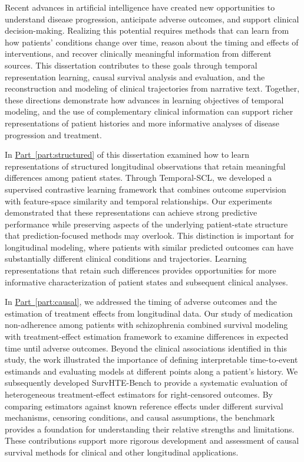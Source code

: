 Recent advances in artificial intelligence have created new opportunities to understand disease progression, anticipate adverse outcomes, and support clinical decision-making.
Realizing this potential requires methods that can learn from how patients' conditions change over time, reason about the timing and effects of interventions, and recover clinically meaningful information from different sources.
This dissertation contributes to these goals through temporal representation learning, causal survival analysis and evaluation, and the reconstruction and modeling of clinical trajectories from narrative text.
Together, these directions demonstrate how advances in learning objectives of temporal modeling, and the use of complementary clinical information can support richer representations of patient histories and more informative analyses of disease progression and treatment.

In \hyperref[part:structured]{Part~\ref*{part:structured}} of this dissertation examined how to learn representations of structured longitudinal observations that retain meaningful differences among patient states.
Through Temporal-SCL, we developed a supervised contrastive learning framework that combines outcome supervision with feature-space similarity and temporal relationships.
Our experiments demonstrated that these representations can achieve strong predictive performance while preserving aspects of the underlying patient-state structure that prediction-focused methods may overlook.
This distinction is important for longitudinal modeling, where patients with similar predicted outcomes can have substantially different clinical conditions and trajectories.
Learning representations that retain such differences provides opportunities for more informative characterization of patient states and subsequent clinical analyses.

In \hyperref[part:causal]{Part~\ref*{part:causal}}, we addressed the timing of adverse outcomes and the estimation of treatment effects from longitudinal data.
Our study of medication non-adherence among patients with schizophrenia combined survival modeling with treatment-effect estimation framework to examine differences in expected time until adverse outcomes.
Beyond the clinical associations identified in this study, the work illustrated the importance of defining interpretable time-to-event estimands and evaluating models at different points along a patient's history.
We subsequently developed SurvHTE-Bench to provide a systematic evaluation of heterogeneous treatment-effect estimators for right-censored outcomes.
By comparing estimators against known reference effects under different survival mechanisms, censoring conditions, and causal assumptions, the benchmark provides a foundation for understanding their relative strengths and limitations.
These contributions support more rigorous development and assessment of causal survival methods for clinical and other longitudinal applications.

